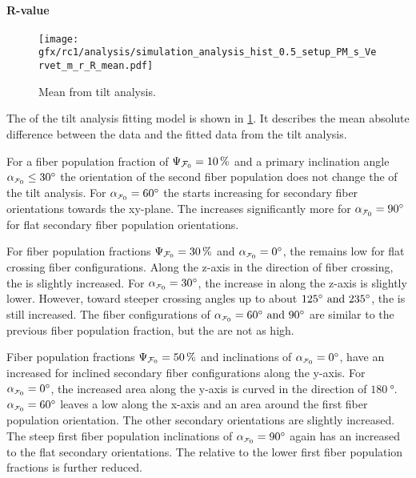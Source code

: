 \paragraph{R-value}
% 
\begin{figure}[!p]
\centering
\texttt{[image: gfx/rc1/analysis/simulation\_analysis\_hist\_0.5\_setup\_PM\_s\_Vervet\_m\_r\_R\_mean.pdf]}
\caption{Mean \rvalue{} from tilt analysis.}
\label{fig:sim_ana_rvalue}
\end{figure}
% 
The \rvalue{} of the tilt analysis fitting model is shown in \cref{fig:sim_ana_rvalue}.
It describes the mean absolute difference between the data and the fitted data from the tilt analysis.
\par
%
For a fiber population fraction of $\textnormal{$\Psi_{\textnormal{$\mathcal{F}_0$}}$}=\SI{10}{\percent}$ and a primary inclination angle $\modelInc\leq\SI{30}{\degree}$ the orientation of the second fiber population does not change the \rvalue{} of the tilt analysis.
For $\modelInc=\SI{60}{\degree}$ the \rvalue{} starts increasing for secondary fiber orientations towards the xy-plane.
The \rvalue{} increases significantly more for $\modelInc=\SI{90}{\degree}$ for flat secondary fiber population orientations.
\par
% 
For fiber population fractions $\textnormal{$\Psi_{\textnormal{$\mathcal{F}_0$}}$}=\SI{30}{\percent}$ and $\modelInc=\SI{0}{\degree}$, the \rvalue{} remains low for flat crossing fiber configurations.
Along the z-axis in the direction of fiber crossing, the \rvalue{} is slightly increased.
For $\modelInc=\SI{30}{\degree}$, the increase in \rvalue{} along the z-axis is slightly lower.
However, toward steeper crossing angles up to about $\SIlist{125;235}{\degree}$, the \rvalue{} is still increased.
The fiber configurations of $\modelInc=\SIlist{60;90}{\degree}$ are similar to the previous fiber population fraction, but the \rvalue{} are not as high.
\par
%
Fiber population fractions $\textnormal{$\Psi_{\textnormal{$\mathcal{F}_0$}}$}=\SI{50}{\percent}$ and inclinations of $\modelInc=\SI{0}{\degree}$, have an increased \rvalue{} for inclined secondary fiber configurations along the y-axis.
For $\modelInc=\SI{0}{\degree}$, the increased area along the y-axis is curved in the direction of $\SI{180}{\degree}$.
$\modelInc=\SI{60}{\degree}$ leaves a low \rvalue{} along the x-axis and an area around the first fiber population orientation.
The other secondary orientations are slightly increased.
The steep first fiber population inclinations of $\modelInc=\SI{90}{\degree}$ again has an increased \rvalue{} to the flat secondary orientations.
The \rvalue{} relative to the lower first fiber population fractions is further reduced.

